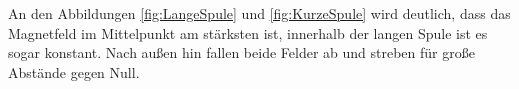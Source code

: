 \noindent An den Abbildungen \ref{fig:LangeSpule} und \ref{fig:KurzeSpule}
wird deutlich, dass das Magnetfeld im Mittelpunkt
am stärksten ist, innerhalb der langen Spule ist es
sogar konstant. Nach außen hin fallen beide Felder
ab und streben für große Abstände gegen Null.



\label{sec:Auswertung}

